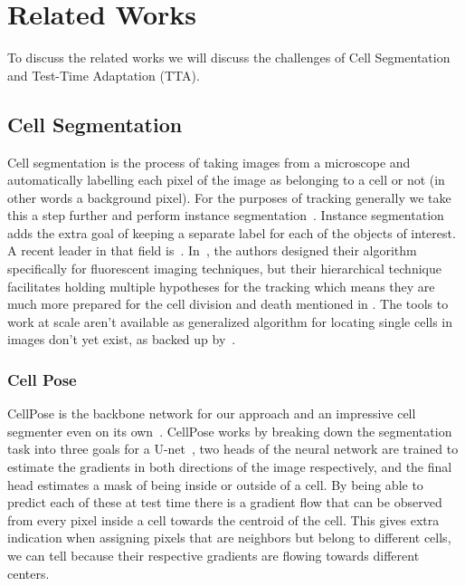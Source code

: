 \section{Related Works}
\label{sec:RW}
To discuss the related works we will discuss the challenges of Cell Segmentation and Test-Time Adaptation (TTA).

\subsection{Cell Segmentation}

Cell segmentation is the process of taking images from a microscope and automatically labelling each pixel of the image as belonging to a cell or not (in other words a background pixel).  For the purposes of tracking generally we take this a step further and perform instance segmentation~\cite{Yang_2019_ICCV}.  Instance segmentation adds the extra goal of keeping a separate label for each of the objects of interest.  \\ 

A recent leader in that field is~\cite{bragantini2024ucmtracking}.  In~\cite{bragantini2024ucmtracking}, the authors designed their algorithm specifically for fluorescent imaging techniques, but their hierarchical technique facilitates holding multiple hypotheses for the tracking which means they are much more prepared for the cell division and death mentioned in .  The tools to work at scale aren't available as generalized algorithm for locating  single cells in images don't yet exist, as backed up by~\cite{greenwald2022whole}.

\subsubsection{Cell Pose}

CellPose is the backbone network for our approach and an impressive cell segmenter even on its own~\cite{stringer2021cellpose}.  CellPose works by breaking down the segmentation task into three goals for a U-net~\cite{Ronneberger2015-dl}, two heads of the neural network are trained to estimate the gradients in both directions of the image respectively, and the final head estimates a mask of being inside or outside of a cell.  By being able to predict each of these at test time there is a gradient flow that can be observed from every pixel inside a cell towards the centroid of the cell. This gives extra indication when assigning pixels that are neighbors but belong to different cells, we can tell because their respective gradients are flowing towards different centers.  

